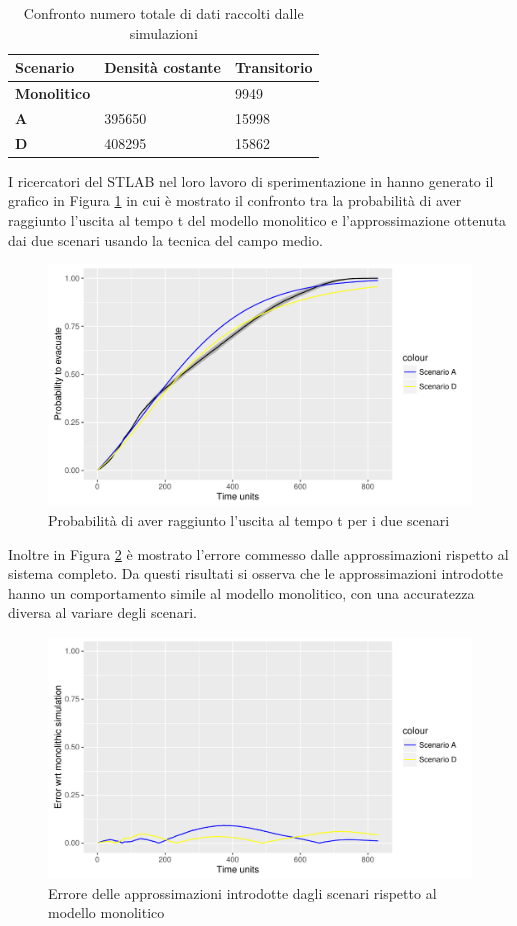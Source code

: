 \begin{table}[h]
  \centering
  \resizebox{0.7\textwidth}{!} {
  \begin{tabular}{ |l|l|l| }
	\hline
	\textbf{Scenario}	&		\textbf{Densità costante}	&		\textbf{Transitorio}	\\ \hline
	\textbf{Monolitico} &		 						&		9949		\\ \hline
	\textbf{A}			 &		395650 				&		15998		\\ \hline
	\textbf{D}			 &		408295 				&		15862		\\ \hline

  \end{tabular}
  }
  \caption{Confronto numero totale di dati raccolti dalle simulazioni}
  \label{tab:tabella-confronto-numero-dati}
\end{table}

I ricercatori del STLAB nel loro lavoro di sperimentazione in \cite{esperimenti-sandro} hanno generato il grafico in Figura \ref{fig:scenariosAD} in cui è mostrato il confronto tra la probabilità di aver raggiunto l'uscita al tempo t del modello monolitico e l'approssimazione ottenuta dai due scenari usando la tecnica del campo medio.

\begin{figure}[htbp]
\centering
\includegraphics[width=.8\textwidth,height=\textheight,keepaspectratio]{images/scenariosAD.pdf}
\caption{Probabilità di aver raggiunto l'uscita al tempo t per i due scenari}
\label{fig:scenariosAD}
\end{figure}

Inoltre in Figura \ref{fig:errorsplotAD} è mostrato l'errore commesso dalle approssimazioni rispetto al sistema completo. Da questi risultati si osserva che le approssimazioni introdotte hanno un comportamento simile al modello monolitico, con una accuratezza diversa al variare degli scenari.

\begin{figure}[htbp]
\centering
\includegraphics[width=.8\textwidth,height=\textheight,keepaspectratio]{images/errorplotAD.pdf}
\caption{Errore delle approssimazioni introdotte dagli scenari rispetto al modello monolitico}
\label{fig:errorsplotAD}
\end{figure}



 